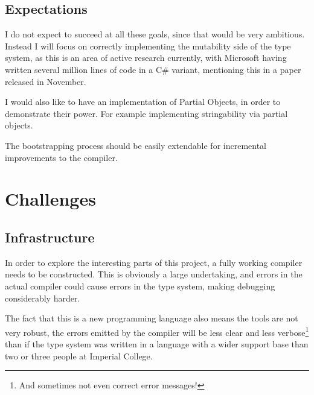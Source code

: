 \documentclass{article}
\begin{document}
\subsection{Expectations}

I do not expect to succeed at all these goals, since that would be very ambitious. Instead I will focus on correctly implementing the mutability side of the type system, as this is an area of active research currently, with Microsoft having written several million lines of code in a C\# variant, mentioning this in a paper released in November.

I would also like to have an implementation of Partial Objects, in order to demonstrate their power. For example implementing stringability via partial objects.

The bootstrapping process should be easily extendable for incremental improvements to the compiler. 

\section{Challenges}

\subsection{Infrastructure}

In order to explore the interesting parts of this project, a fully working compiler needs to be constructed. This is obviously a large undertaking, and errors in the actual compiler could cause errors in the type system, making debugging considerably harder.

The fact that this is a new programming language also means the tools are not very robust, the errors emitted by the compiler will be less clear and less verbose\footnote{And sometimes not even correct error messages!} than if the type system was written in a language with a wider support base than two or three people at Imperial College.
\end{document}
